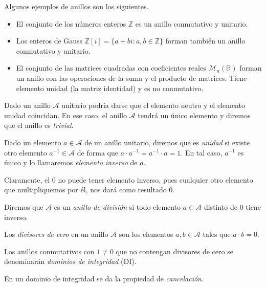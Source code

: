 \begin{ejemplo} Algunos ejemplos de anillos son los siguientes.
    \begin{itemize}
        \item El conjunto de los números enteros $\mathds{Z}$ es un anillo conmutativo y unitario.
        \item Los enteros de Gauss $\mathds{Z}[i] = \{a + bi : a,b \in \mathds{Z}\}$ forman también un anillo conmutativo y unitario.
        \item El conjunto de las matrices cuadradas con coeficientes reales $\mathcal{M}_n(\mathbb{R})$ forman un anillo con las operaciones de la suma y el producto de matrices. Tiene elemento unidad (la matriz identidad) y es no conmutativo.
    \end{itemize}
\end{ejemplo}


Dado un anillo $\mathcal{A}$ unitario podría darse que el elemento neutro y el elemento unidad coincidan. En ese caso, el anillo $\mathcal{A}$ tendrá un único elemento y diremos que el anillo es \emph{trivial}. 

\begin{definicion}
Dado un elemento $a \in \mathcal{A}$ de un anillo unitario, diremos que es \emph{unidad} si existe otro elemento $a^{-1} \in \mathcal{A}$ de forma que $a\cdot a^{-1} = a^{-1}\cdot a = 1$. En tal caso, $a^{-1}$ es único y lo llamaremos \emph{elemento inverso} de $a$.
\end{definicion}

Claramente, el $0$ no puede tener elemento inverso, pues cualquier otro elemento que multipliquemos por él, nos dará como resultado $0$. 

\begin{definicion}
    Diremos que $\mathcal{A}$ es un \emph{anillo de división} si todo elemento $a \in \mathcal{A}$ distinto de $0$ tiene inverso.
\end{definicion}

\begin{definicion}
    Los \emph{divisores de cero} en un anillo $\mathcal{A}$ son los elementos $a,b \in \mathcal{A}$ tales que $a\cdot b = 0$.
\end{definicion}

Los anillos conmutativos con $1 \neq 0$ que no contengan divisores de cero se denominarán \emph{dominios de integridad} (DI).

En un dominio de integridad se da la propiedad de \emph{cancelación}.

